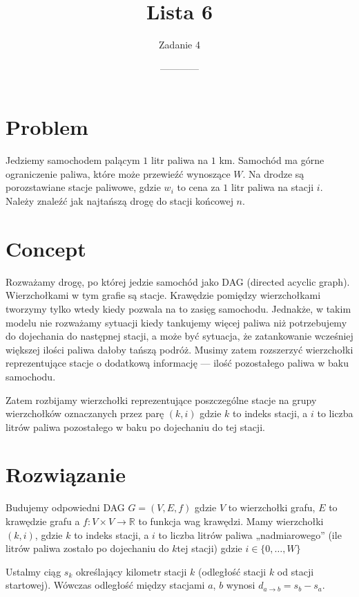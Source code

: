 \documentclass[14pt]{article}
\title{Lista 6}
\author{Zadanie 4}
\date{------------}
\begin{document}
\maketitle

\section{Problem}

Jedziemy samochodem palącym $1$ litr paliwa na $1$ km. Samochód ma górne ograniczenie paliwa, które może przewieźć wynoszące $W$. Na drodze są porozstawiane stacje paliwowe, gdzie $w_i$ to cena za $1$ litr paliwa na stacji $i$.
Należy znaleźć jak najtańszą drogę do stacji końcowej $n$.

\section{Concept}

Rozważamy drogę, po której jedzie samochód jako DAG (directed acyclic graph). Wierzchołkami w tym grafie są stacje. Krawędzie pomiędzy wierzchołkami tworzymy tylko wtedy kiedy pozwala na to zasięg samochodu. Jednakże, w takim modelu nie rozważamy sytuacji kiedy tankujemy więcej paliwa niż potrzebujemy do dojechania do następnej stacji, a może być sytuacja, że zatankowanie wcześniej większej ilości paliwa dałoby tańszą podróż. Musimy zatem rozszerzyć wierzchołki reprezentujące stacje o dodatkową informację — ilość pozostałego paliwa w baku samochodu.

Zatem rozbijamy wierzchołki reprezentujące poszczególne stacje na grupy wierzchołków oznaczanych przez parę $(k,i)$ gdzie $k$ to indeks stacji, a $i$ to liczba litrów paliwa pozostałego w baku po dojechaniu do tej stacji.

\section{Rozwiązanie}

Budujemy odpowiedni DAG $G=(V,E,f)$ gdzie $V$ to wierzchołki grafu, $E$ to krawędzie grafu a $f:V\times V \to \mathbb{R}$ to funkcja wag krawędzi.
Mamy wierzchołki $(k,i)$, gdzie $k$ to indeks stacji, a $i$ to liczba litrów paliwa „nadmiarowego” (ile litrów paliwa zostało po dojechaniu do $k$tej stacji) gdzie $i\in \{0,\dots,W\}$

Ustalmy ciąg $s_k$ określający kilometr stacji $k$ (odległość stacji $k$ od stacji startowej).
Wówczas odległość między stacjami $a$, $b$ wynosi $d_{a\to b} = s_b - s_a$.
\end{document}
